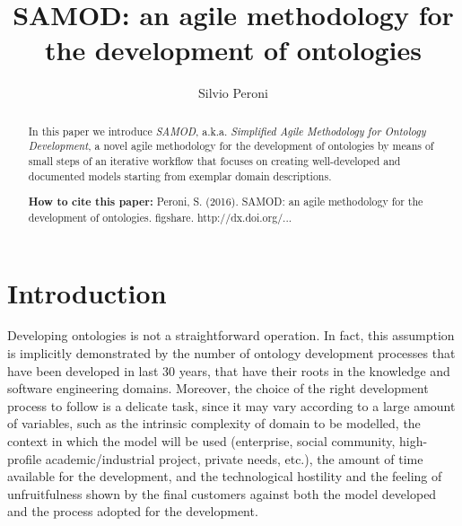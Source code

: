 \documentclass[runningheads,a4paper]{llncs}
\begin{document}
\mainmatter

\title{SAMOD: an agile methodology for the development of ontologies}
\author{Silvio Peroni}

\maketitle

\begin{abstract}
In this paper we introduce {\em SAMOD}, a.k.a. {\em Simplified Agile Methodology for Ontology Development}, a novel agile methodology for the development of ontologies by means of small steps of an iterative workflow that focuses on creating well-developed and documented models starting from exemplar domain descriptions.

{\bf How to cite this paper:} Peroni, S. (2016). SAMOD: an agile methodology for the development of ontologies. figshare. http://dx.doi.org/...

\end{abstract}


\section{Introduction}\label{__RefHeading__2452_1461357291}

Developing ontologies is not a straightforward operation. In fact, this assumption is implicitly demonstrated by the number of ontology development processes that have been developed in last 30 years, that have their roots in the knowledge and software engineering domains. Moreover, the choice of the right development process to follow is a delicate task, since it may vary according to a large amount of variables, such as the intrinsic complexity of domain to be modelled, the context in which the model will be used (enterprise, social community, high-profile academic/industrial project, private needs, etc.), the amount of time available for the development, and the technological hostility and the feeling of unfruitfulness shown by the final customers against both the model developed and the process adopted for the development.
\end{document}
